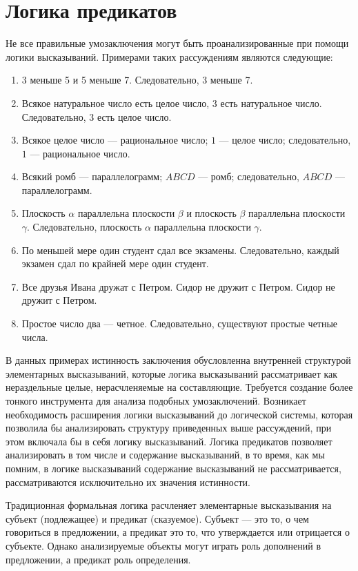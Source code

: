 \documentclass[letterpaper, 10pt]{article}
\theoremstyle{definition}
\begin{document}
\section{Логика предикатов}
	Не все правильные умозаключения могут быть проанализированные при помощи
	логики высказываний. Примерами таких рассуждениям являются следующие:

	\begin{enumerate}
		\item 3 меньше 5 и 5 меньше 7. Следовательно, 3 меньше 7.
		\item Всякое натуральное число есть целое число, 3 есть натуральное
			число. Следовательно, 3 есть целое число.
		\item Всякое целое число --- рациональное число; $1$ --- целое число;
			следовательно, $1$ --- рациональное число.
		\item Всякий ромб --- параллелограмм; $ABCD$ --- ромб; следовательно,
			$ABCD$ --- параллелограмм.
		\item Плоскость $\alpha$ параллельна плоскости $\beta$ и плоскость
			$\beta$ параллельна плоскости $\gamma$. Следовательно, плоскость
			$\alpha$ параллельна плоскости $\gamma$.
		\item По меньшей мере один студент сдал все экзамены. Следовательно,
			каждый экзамен сдал по крайней мере один студент.
		\item Все друзья Ивана дружат с Петром. Сидор не дружит с Петром. Сидор
			не дружит с Петром.
		\item Простое число два --- четное. Следовательно, существуют простые
			четные числа.
	\end{enumerate}

	В данных примерах истинность заключения обусловленна внутренней структурой
	элементарных высказываний, которые логика высказываний рассматривает 
	как нераздельные целые, нерасчленяемые на составляющие. Требуется создание более
	тонкого инструмента для анализа подобных умозаключений.
	Возникает необходимость расширения логики высказываний до логической
	системы, которая позволила бы анализировать структуру приведенных выше
	рассуждений, при этом включала бы в себя логику высказываний. Логика
	предикатов позволяет анализировать в том числе и содержание высказываний, в
	то время, как мы помним, в логике высказываний содержание высказываний не
	рассматривается, рассматриваются исключительно их значения истинности.

	Традиционная формальная логика расчленяет элементарные высказывания на
	субъект (подлежащее) и предикат (сказуемое). Субъект ---
	это то, о чем говориться в предложении, а предикат это то, что утверждается
	или отрицается о субъекте. Однако анализируемые объекты
	могут играть роль дополнений в предложении, а предикат роль определения.
\end{document}
